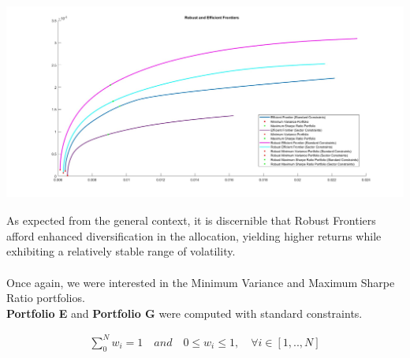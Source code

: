 \documentclass{assignment}
\begin{document}
\begin{center}
    \includegraphics[height=6.5cm]{assets/Plot_3.jpg}
\end{center}
\bigskip
As expected from the general context, it is discernible that Robust Frontiers afford enhanced
diversification in the allocation, yielding higher returns while exhibiting a relatively stable
range of volatility. \\\\
Once again, we were interested in the Minimum Variance and Maximum Sharpe Ratio portfolios.\\
\textbf{Portfolio E} and \textbf{Portfolio G} were computed with standard constraints.

\begin{align*}
    \sum_{0}^{N}{w_{i}} = 1 \quad and \quad
    0\leq w_i \leq 1 ,\quad  \forall i\in \left [ 1,..,N \right ]  
\end{align*}
\end{document}
